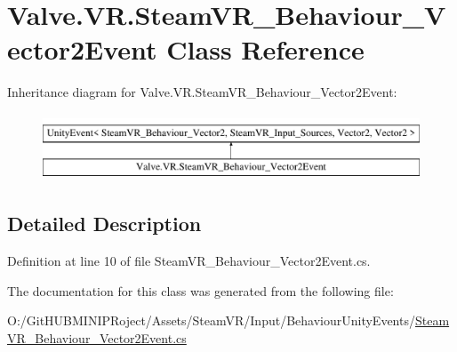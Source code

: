 \hypertarget{class_valve_1_1_v_r_1_1_steam_v_r___behaviour___vector2_event}{}\section{Valve.\+V\+R.\+Steam\+V\+R\+\_\+\+Behaviour\+\_\+\+Vector2\+Event Class Reference}
\label{class_valve_1_1_v_r_1_1_steam_v_r___behaviour___vector2_event}
Inheritance diagram for Valve.\+V\+R.\+Steam\+V\+R\+\_\+\+Behaviour\+\_\+\+Vector2\+Event\+:\begin{figure}[H]
\begin{center}
\leavevmode
\includegraphics[height=2.000000cm]{class_valve_1_1_v_r_1_1_steam_v_r___behaviour___vector2_event}
\end{center}
\end{figure}


\subsection{Detailed Description}


Definition at line 10 of file Steam\+V\+R\+\_\+\+Behaviour\+\_\+\+Vector2\+Event.\+cs.



The documentation for this class was generated from the following file\+:\begin{DoxyCompactItemize}
\item 
O\+:/\+Git\+H\+U\+B\+M\+I\+N\+I\+P\+Roject/\+Assets/\+Steam\+V\+R/\+Input/\+Behaviour\+Unity\+Events/\mbox{\hyperlink{_steam_v_r___behaviour___vector2_event_8cs}{Steam\+V\+R\+\_\+\+Behaviour\+\_\+\+Vector2\+Event.\+cs}}\end{DoxyCompactItemize}
